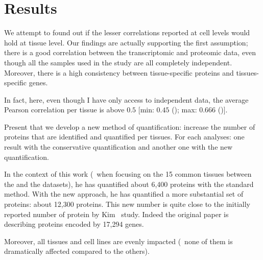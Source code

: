 \section{Results}\label{sec:IntegrationResults}


We attempt to found out if the lesser correlations reported at cell levels would
hold at tissue level.
Our findings are actually supporting the first assumption; there is a good correlation
between the transcriptomic and proteomic data, even though all the samples used in
the study are all completely independent. Moreover, there is a high consistency
between tissue-specific proteins and tissues-specific genes.

In fact, here, even though I have only access to independent data,
the average Pearson correlation per tissue is above $0.5$
$[$min: $0.45$ (\Oesophagus); max: $0.666$ (\Liver)$]$.




Present that we develop a new method of quantification:
increase the number of proteins that are identified and quantified per tissues.
For each analyses: one result with the conservative quantification
and another one with the new quantification.



In the context of this work (\ie\ when focusing on the 15 common tissues between
the  and the  datasets),
he has quantified about 6,400 proteins with
the standard method. With the new approach, he has quantified a more substantial set of
proteins: about 12,300 proteins. This new number is quite close to the initially
reported number of protein by Kim \etal\ study.
Indeed the original paper is describing proteins encoded by 17,294 genes.

Moreover, all tissues and cell lines are evenly impacted
(\ie\ none of them is dramatically affected compared to the others).

